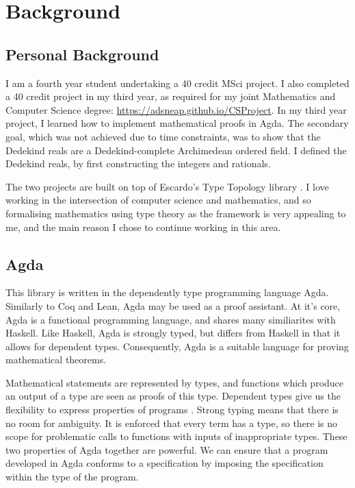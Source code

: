 \documentclass[ProjectReport]{subfiles}
\begin{document}
\section{Background}

\subsection{Personal Background}

I am a fourth year student undertaking a 40 credit MSci project. I also completed a 40 credit project in my third year, as required for my joint Mathematics and Computer Science degree: \url{https://adsneap.github.io/CSProject}. In my third year project, I learned how to implement mathematical proofs in Agda. The secondary goal, which was not achieved due to time constraints, was to show that the Dedekind reals are a Dedekind-complete Archimedean ordered field. I defined the Dedekind reals, by first constructing the integers and rationals.

The two projects are built on top of Escardo's Type Topology library \cite{TypeTopology}. I love working in the intersection of computer science and mathematics, and so formalising mathematics using type theory as the framework is very appealing to me, and the main reason I chose to continue working in this area.

\subsection{Agda}

This library is written in the dependently type programming language Agda. Similarly to Coq and Lean, Agda may be used as a proof assistant. At it's core, Agda is a functional programming language, and shares many similiarites with Haskell. Like Haskell, Agda is strongly typed, but differs from Haskell in that it allows for dependent types. Consequently, Agda is a suitable language for proving mathematical theorems. 

Mathematical statements are represented by types, and functions which produce an output of a type are seen as proofs of this type. Dependent types give us the flexibility to express properties of programs \cite{AgdaDependentTypes}. Strong typing means that there is no room for ambiguity. It is enforced that every term has a type, so there is no scope for problematic calls to functions with inputs of inappropriate types. These two properties of Agda together are powerful. We can ensure that a program developed in Agda conforms to a specification by imposing the specification within the type of the program.
\end{document}
